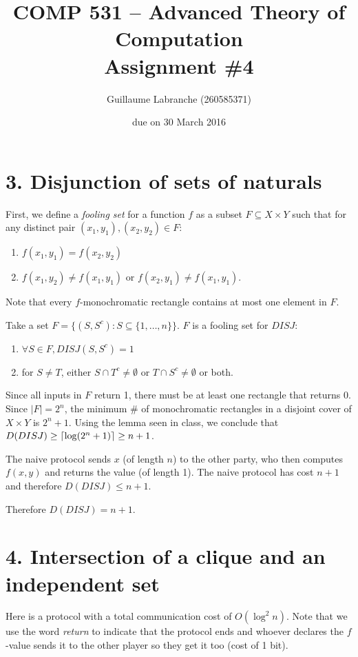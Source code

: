 \documentclass{article}
\author{Guillaume Labranche (260585371)}
\title{COMP 531 -- Advanced Theory of Computation\\Assignment \#4}
\date{due on 30 March 2016}
\DeclarePairedDelimiter{\ceil}{\lceil}{\rceil}
\begin{document}
\maketitle

\section*{3. Disjunction of sets of naturals}
First, we define a \textit{fooling set} for a function $f$ as a subset $F \subseteq X \times Y$ such that for any distinct pair $(x_1, y_1),(x_2, y_2) \in F$:
\begin{enumerate}
\item $f(x_1,y_1)=f(x_2,y_2)$
\item $f(x_1, y_2)\not=f(x_1,y_1)$ or $f(x_2, y_1)\not=f(x_1,y_1)$.
\end{enumerate}

Note that every $f$-monochromatic rectangle contains at most one element in $F$.

Take a set $F = \big\{(S,S^c) : S \subseteq \{1,\dotsc,n\}\big\}$. $F$ is a fooling set for $DISJ$:

\begin{enumerate}
\item $\forall S \in F, DISJ(S,S^c)=1$
\item for $S \not= T$, either $S \cap T^c \not= \emptyset$ or $T \cap S^c \not= \emptyset$ or both.
\end{enumerate}
Since all inputs in $F$ return 1, there must be at least one rectangle that returns 0. Since $|F|=2^n$, the minimum \# of monochromatic rectangles in a disjoint cover of $X \times Y$ is $2^n+1$. Using the lemma seen in class, we conclude that $D(DISJ) \geq \ceil{\log(2^n+1)} \geq n+1$.

The naive protocol sends $x$ (of length $n$) to the other party, who then computes $f(x,y)$ and returns the value (of length 1). The naive protocol has cost $n+1$ and therefore $D(DISJ) \leq n+1$.

Therefore $D(DISJ) = n+1$.

\newpage
\section*{4. Intersection of a clique and an independent set}
Here is a protocol with a total communication cost of $O(\log^2 n)$. Note that we use the word \textit{return} to indicate that the protocol ends and whoever declares the $f$-value sends it to the other player so they get it too (cost of 1 bit).
\end{document}
